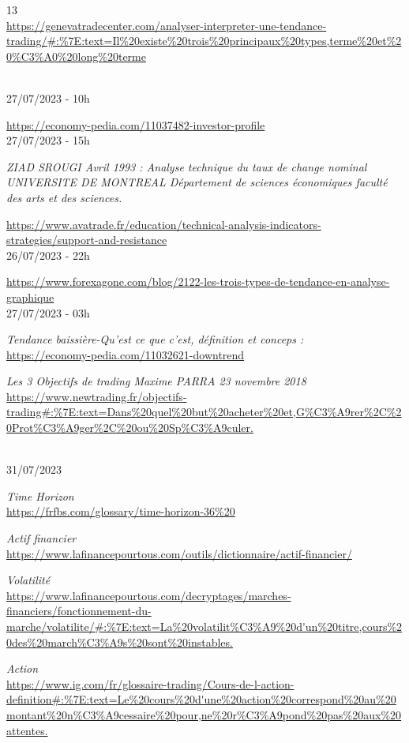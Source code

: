 {13}\\
\url{https://genevatradecenter.com/analyser-interpreter-une-tendance-trading/#:%7E:text=Il%20existe%20trois%20principaux%20types,terme%20et%20%C3%A0%20long%20terme}\strut \\
27/07/2023 - 10h

\hfill\break
\url{https://economy-pedia.com/11037482-investor-profile}\\
27/07/2023 - 15h

\emph{ZIAD SROUGI Avril 1993 : Analyse technique du taux de change
nominal \textbar{} UNIVERSITE DE MONTREAL \textbar{} Département de
sciences économiques faculté des arts et des sciences.}

\hfill\break
\url{https://www.avatrade.fr/education/technical-analysis-indicators-strategies/support-and-resistance}\\
26/07/2023 - 22h

\hfill\break
\url{https://www.forexagone.com/blog/2122-les-trois-types-de-tendance-en-analyse-graphique}\\
27/07/2023 - 03h

\emph{Tendance baissière-Qu'est ce que c'est, définition et conceps :}\\
\url{https://economy-pedia.com/11032621-downtrend}

\emph{Les 3 Objectifs de trading \textbar{} Maxime PARRA \textbar{} 23
novembre 2018}\\
\url{https://www.newtrading.fr/objectifs-trading#:%7E:text=Dans%20quel%20but%20acheter%20et,G%C3%A9rer%2C%20Prot%C3%A9ger%2C%20ou%20Sp%C3%A9culer.}\strut \\
31/07/2023

\emph{Time Horizon}\\
\url{https://frfbs.com/glossary/time-horizon-36%20}

\emph{Actif financier}\\
\url{https://www.lafinancepourtous.com/outils/dictionnaire/actif-financier/}

\emph{Volatilité}\\
\url{https://www.lafinancepourtous.com/decryptages/marches-financiers/fonctionnement-du-marche/volatilite/#:%7E:text=La%20volatilit%C3%A9%20d'un%20titre,cours%20des%20march%C3%A9s%20sont%20instables.}

\emph{Action}\\
\url{https://www.ig.com/fr/glossaire-trading/Cours-de-l-action-definition#:%7E:text=Le%20cours%20d'une%20action%20correspond%20au%20montant%20n%C3%A9cessaire%20pour,ne%20r%C3%A9pond%20pas%20aux%20attentes.}
